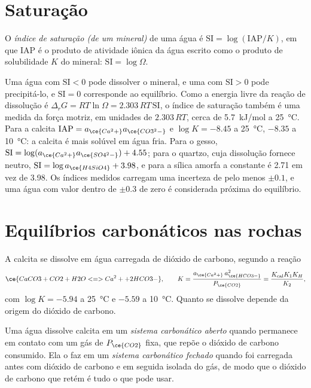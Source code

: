 \section{Saturação}\label{sec:b3:water-rock-interaction:saturation}

\begin{definition}\label{def:b3:water-rock-interaction:si}
O \emph{índice de saturação (de um mineral)}
de uma água é $\mathrm{SI} = \log(\mathrm{IAP}/K)$, em que IAP é
o produto de atividade iônica da água escrito como o produto de solubilidade
$K$ do mineral: $\mathrm{SI} = \log\Omega$.
\end{definition}

Uma água com $\mathrm{SI} < 0$ pode dissolver o mineral, e uma com
$\mathrm{SI} > 0$ pode precipitá-lo, e $\mathrm{SI} = 0$ corresponde ao equilíbrio.
Como a energia livre da reação de dissolução é $\Delta_r G = RT\ln\Omega
= 2.303\,RT\,\mathrm{SI}$, o índice de saturação também é uma medida da
força motriz, em unidades de $2.303\,RT$, cerca de \qty{5.7}{kJ/mol} a
\qty{25}{\celsius}. Para a calcita $\mathrm{IAP} = a_{\ce{Ca^2+}}
a_{\ce{CO3^2-}}$ e $\log K = -8.45$ a \qty{25}{\celsius}, $-8.35$ a
\qty{10}{\celsius}: a calcita é mais solúvel em água fria. Para o gesso, $\mathrm{SI} = \log(a_{\ce{Ca^2+}}a_{\ce{SO4^2-}}) + 4.55$;
para o quartzo, cuja dissolução fornece  neutro, $\mathrm{SI} = \log
a_{\ce{H4SiO4}} + 3.98$, e para a sílica amorfa a constante é 2.71
em vez de 3.98. Os índices medidos carregam uma incerteza de pelo menos $\pm0.1$,
e uma água com valor dentro de $\pm0.3$ de zero é considerada próxima do equilíbrio.

\section{Equilíbrios carbonáticos nas rochas}\label{sec:b3:water-rock-interaction:carbonate}

A calcita se dissolve em água carregada de dióxido de carbono, segundo a reação
\[
\ce{CaCO3 + CO2 + H2O <=> Ca^2+ + 2 HCO3-},
\qquad K = \frac{a_{\ce{Ca^2+}}\,a_{\ce{HCO3-}}^2}{P_{\ce{CO2}}}
= \frac{K_{\mathrm{cal}}K_1K_H}{K_2},
\]
com $\log K = -5.94$ a \qty{25}{\celsius} e $-5.59$ a \qty{10}{\celsius}.
Quanto se dissolve depende da origem do dióxido de carbono.

\begin{definition}\label{def:b3:water-rock-interaction:open-closed}
Uma água dissolve calcita em um \emph{sistema carbonático aberto}
quando permanece em contato com um gás de
$P_{\ce{CO2}}$ fixa, que repõe o dióxido de carbono consumido. Ela o faz em um
\emph{sistema carbonático fechado} quando foi carregada antes com dióxido de carbono e
em seguida isolada do gás, de modo que
o dióxido de carbono que retém é tudo o que pode usar.
\end{definition}

